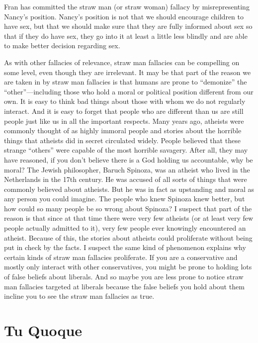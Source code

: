 Fran has committed the straw man (or straw woman) fallacy by misrepresenting Nancy's position. Nancy's position is not that we should encourage children to have sex, but that we should make sure that they are fully informed about sex so that if they do have sex, they go into it at least a little less blindly and are able to make better decision regarding sex.

As with other fallacies of relevance, straw man fallacies can be compelling on some level, even though they are irrelevant. It may be that part of the reason we are taken in by straw man fallacies is that humans are prone to ``demonize'' the ``other''---including those who hold a moral or political position different from our own. It is easy to think bad things about those with whom we do not regularly interact. And it is easy to forget that people who are different than us are still people just like us in all the important respects. Many years ago, atheists were commonly thought of as highly immoral people and stories about the horrible things that atheists did in secret circulated widely. People believed that these strange ``others'' were capable of the most horrible savagery. After all, they may have reasoned, if you don't believe there is a God holding us accountable, why be moral? The Jewish philosopher, Baruch Spinoza, was an atheist who lived in the Netherlands in the 17th century. He was accused of all sorts of things that were commonly believed about atheists. But he was in fact as upstanding and moral as any person you could imagine. The people who knew Spinoza knew better, but how could so many people be so wrong about Spinoza? I suspect that part of the reason is that since at that time there were very few atheists (or at least very few people actually admitted to it), very few people ever knowingly encountered an atheist. Because of this, the stories about atheists could proliferate without being put in check by the facts. I suspect the same kind of phenomenon explains why certain kinds of straw man fallacies proliferate. If you are a conservative and mostly only interact with other conservatives, you might be prone to holding lots of false beliefs about liberals. And so maybe you are less prone to notice straw man fallacies targeted at liberals because the false beliefs you hold about them incline you to see the straw man fallacies as true.

\section{Tu Quoque}\label{sec:tuquoque}


